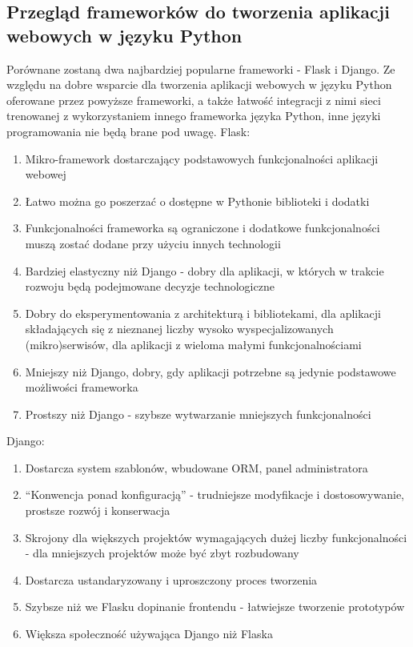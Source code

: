 \documentclass[polish,12pt]{aghthesis}
\begin{document}
\subsection{Przegląd frameworków do tworzenia aplikacji webowych w języku Python}
\par Porównane zostaną dwa najbardziej popularne frameworki - Flask i Django. Ze względu na dobre wsparcie dla tworzenia aplikacji webowych w języku Python oferowane przez powyższe frameworki, a także łatwość integracji z nimi sieci trenowanej z wykorzystaniem innego frameworka języka Python, inne języki programowania nie będą brane pod uwagę.
\vspace{5mm}
\newline Flask:
\begin{enumerate}
    \item Mikro-framework dostarczający podstawowych funkcjonalności aplikacji webowej
    \item Łatwo można go poszerzać o dostępne w Pythonie biblioteki i dodatki
    \item Funkcjonalności frameworka są ograniczone i dodatkowe funkcjonalności muszą zostać dodane przy użyciu innych technologii
    \item Bardziej elastyczny niż Django - dobry dla aplikacji, w których w trakcie rozwoju będą podejmowane decyzje technologiczne
    \item Dobry do eksperymentowania z architekturą i bibliotekami, dla aplikacji składających się z nieznanej liczby wysoko wyspecjalizowanych (mikro)serwisów, dla aplikacji z wieloma małymi funkcjonalnościami
    \item Mniejszy niż Django, dobry, gdy aplikacji potrzebne są jedynie podstawowe możliwości frameworka
    \item Prostszy niż Django - szybsze wytwarzanie mniejszych funkcjonalności
\end{enumerate}
Django:
\begin{enumerate}
    \item Dostarcza system szablonów, wbudowane ORM, panel administratora
    \item “Konwencja ponad konfiguracją” - trudniejsze modyfikacje i dostosowywanie, prostsze rozwój i konserwacja
    \item Skrojony dla większych projektów wymagających dużej liczby funkcjonalności - dla mniejszych projektów może być zbyt rozbudowany
    \item Dostarcza ustandaryzowany i uproszczony proces tworzenia
    \item Szybsze niż we Flasku dopinanie frontendu - łatwiejsze tworzenie prototypów
    \item Większa społeczność używająca Django niż Flaska
\end{enumerate}
\end{document}
